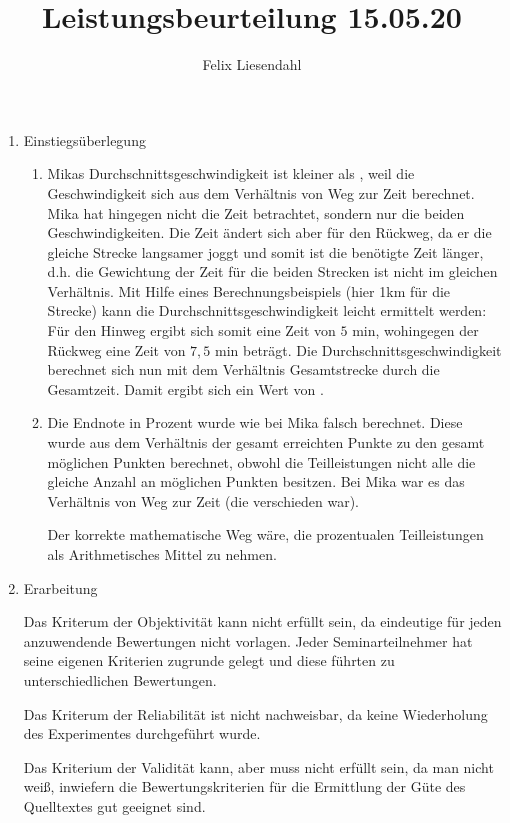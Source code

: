 \documentclass[12pt]{scrartcl}
\title{Leistungsbeurteilung 15.05.20}
\author{Felix Liesendahl}
\begin{document}
\maketitle

\begin{enumerate}
  \item Einstiegsüberlegung
  \begin{enumerate}
    \item Mikas Durchschnittsgeschwindigkeit ist kleiner als , weil die Geschwindigkeit sich aus dem Verhältnis von Weg zur Zeit berechnet. Mika hat hingegen nicht die Zeit betrachtet, sondern nur die beiden Geschwindigkeiten. Die Zeit ändert sich aber für den Rückweg, da er die gleiche Strecke langsamer joggt und somit ist die benötigte Zeit länger, d.h. die Gewichtung der Zeit für die beiden Strecken ist nicht im gleichen Verhältnis.
    Mit Hilfe eines Berechnungsbeispiels (hier 1km für die Strecke) kann die Durchschnittsgeschwindigkeit leicht ermittelt werden: Für den Hinweg ergibt sich somit eine Zeit von \(5\) min, wohingegen der Rückweg eine Zeit von \(7,5\) min beträgt.
    Die Durchschnittsgeschwindigkeit berechnet sich nun mit dem Verhältnis Gesamtstrecke durch die Gesamtzeit. Damit ergibt sich ein Wert von .
    \item Die Endnote in Prozent wurde wie bei Mika falsch berechnet. Diese wurde aus dem Verhältnis der gesamt erreichten Punkte zu den gesamt möglichen Punkten berechnet, obwohl die Teilleistungen nicht alle die gleiche Anzahl an möglichen Punkten besitzen. Bei Mika war es das Verhältnis von Weg zur Zeit (die verschieden war).

    Der korrekte mathematische Weg wäre, die prozentualen Teilleistungen als Arithmetisches Mittel zu nehmen.
  \end{enumerate}\newpage
  \item Erarbeitung

  Das Kriterum der Objektivität kann nicht erfüllt sein, da eindeutige für jeden anzuwendende Bewertungen nicht vorlagen. Jeder Seminarteilnehmer hat seine eigenen Kriterien zugrunde gelegt und diese führten zu unterschiedlichen Bewertungen.

  Das Kriterum der Reliabilität ist nicht nachweisbar, da keine Wiederholung des Experimentes durchgeführt wurde.

  Das Kriterium der Validität kann, aber muss nicht erfüllt sein, da man nicht weiß, inwiefern die Bewertungskriterien für die Ermittlung der Güte des Quelltextes gut geeignet sind.


\end{enumerate}
\end{document}
